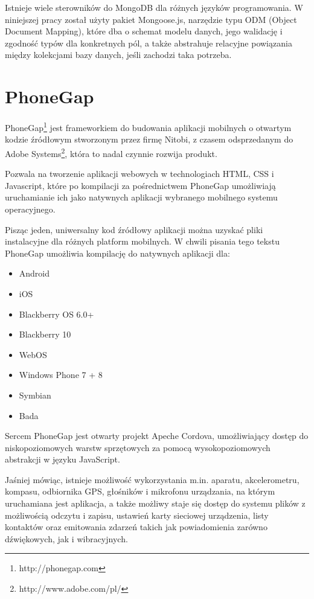 \documentclass[twoside,a4paper]{book}
\begin{document}
Istnieje wiele sterowników do MongoDB dla różnych języków programowania. W niniejszej pracy został użyty pakiet Mongoose.js, narzędzie typu ODM (Object Document Mapping), które dba o schemat modelu danych, jego walidację i zgodność typów dla konkretnych pól, a także abstrahuje relacyjne powiązania między kolekcjami bazy danych, jeśli zachodzi taka potrzeba.


\section{PhoneGap}

PhoneGap\footnote{http://phonegap.com} jest frameworkiem do budowania aplikacji mobilnych o otwartym kodzie źródłowym stworzonym przez firmę Nitobi, z czasem odsprzedanym do Adobe Systems\footnote{http://www.adobe.com/pl/}, która to nadal czynnie rozwija produkt.

Pozwala na tworzenie aplikacji webowych w technologiach HTML, CSS i Javascript, które po kompilacji za pośrednictwem PhoneGap umożliwiają uruchamianie ich jako natywnych aplikacji wybranego mobilnego systemu operacyjnego. 

Pisząc jeden, uniwersalny kod źródłowy aplikacji można uzyskać pliki instalacyjne dla różnych platform mobilnych. W chwili pisania tego tekstu PhoneGap umożliwia kompilację do natywnych aplikacji dla:
\begin{itemize}
	\item Android
	\item iOS
	\item Blackberry OS 6.0+
	\item Blackberry 10
	\item WebOS
	\item Windows Phone 7 + 8
	\item Symbian
	\item Bada
\end{itemize}

Sercem PhoneGap jest otwarty projekt Apeche Cordova, umożliwiający dostęp do niskopoziomowych warstw sprzętowych za pomocą wysokopoziomowych abstrakcji w języku JavaScript. 

Jaśniej mówiąc, istnieje możliwość wykorzystania m.in. aparatu, akcelerometru, kompasu, odbiornika GPS, głośników i mikrofonu urządzania, na którym uruchamiana jest aplikacja, a także możliwy staje się dostęp do systemu plików z możliwością odczytu i zapisu, ustawień karty sieciowej urządzenia, listy kontaktów oraz emitowania zdarzeń takich jak powiadomienia zarówno dźwiękowych, jak i wibracyjnych.
\end{document}

